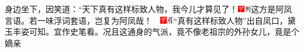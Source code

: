 身边坐下，因笑道：“天下真有这样标致人物，我今儿才算见了！{\includegraphics[width=3mm]{../Images/00002}\includegraphics[width=3mm]{../Images/00011}\footnotesize \kaishu 这方是阿凤言语。若一味浮词套语，岂复为阿凤哉！　\includegraphics[width=3mm]{../Images/00002}\includegraphics[width=3mm]{../Images/00010}\footnotesize \kaishu “真有这样标致人物”出自凤口，黛玉丰姿可知。宜作史笔看。}况且这通身的气派，竟不像老祖宗的外孙女儿，竟是个嫡亲